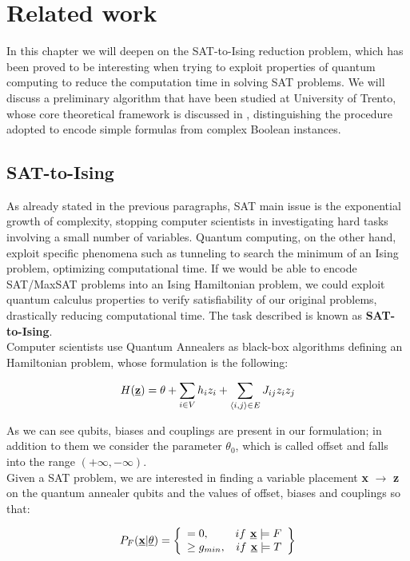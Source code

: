 \chapter{Related work}
\label{cha:related}

In this chapter we will deepen on the SAT-to-Ising reduction problem, which has been proved to be interesting when trying to exploit properties of quantum computing to reduce the computation time in solving SAT problems. We will discuss a preliminary algorithm that have been studied at University of Trento, whose core theoretical framework is discussed in \cite{pa12}, distinguishing the procedure adopted to encode simple formulas from complex Boolean instances.

\section{SAT-to-Ising}
\label{sec:SATtoQUBO}

As already stated in the previous paragraphs, SAT main issue is the exponential growth of complexity, stopping computer scientists in investigating hard tasks involving a small number of variables. Quantum computing, on the other hand, exploit specific phenomena such as tunneling to search the minimum of an Ising problem, optimizing computational time. If we would be able to encode SAT/MaxSAT problems into an Ising Hamiltonian problem, we could exploit quantum calculus properties to verify satisfiability of our original problems, drastically reducing computational time. The task described is known as \textbf{SAT-to-Ising}. \\
Computer scientists use Quantum Annealers as black-box algorithms defining an Hamiltonian problem, whose formulation is the following:

\begin{equation}
    H(\textbf{\underline{z}}) =\theta + \sum_{i \in V} h_iz_i + \sum_{\langle i,j\rangle \in E} J_{ij} z_iz_j
\end{equation}

As we can see qubits, biases and couplings are present in our formulation; in addition to them we consider the parameter $\theta_0$, which is called offset and falls into the range $(+\infty, -\infty)$. \\
Given a SAT problem, we are interested in finding a variable placement \textbf{x} $\rightarrow$ \textbf{z} on the quantum annealer qubits and the values of offset, biases and couplings so that:

\begin{equation}
    P_F(\underline{\textbf{x}} | \underline{\theta}) = 
    \left\{
        \begin{array}{lr}
            = 0, & if \textbf{ \underline{x}} \models F \\
            \geq g_{min}, & if \textbf{ \underline{x}} \models T
        \end{array}
    \right\}
\end{equation}

